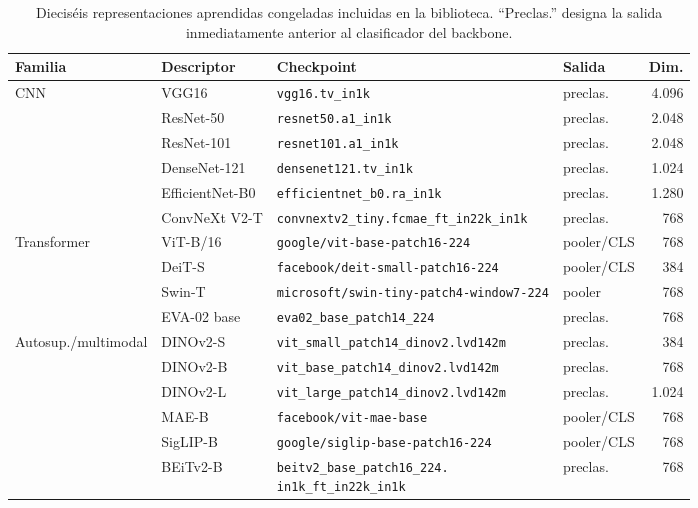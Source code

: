 \documentclass[a4paper,fleqn]{cas-sc}
\begin{document}
\begin{table}[pos=htbp]
\centering
\caption{Dieciséis representaciones aprendidas congeladas incluidas en la biblioteca. ``Preclas.'' designa la salida inmediatamente anterior al clasificador del backbone.}
\label{tab:extractores-aprendidos}
\small
\setlength{\tabcolsep}{4pt}
\begin{tabular}{@{}llp{6.3cm}p{1.7cm}r@{}}
\toprule
Familia & Descriptor & Checkpoint & Salida & Dim. \\
\midrule
CNN & VGG16 & \texttt{vgg16.tv\_in1k} & preclas. & 4.096 \\
 & ResNet-50 & \texttt{resnet50.a1\_in1k} & preclas. & 2.048 \\
 & ResNet-101 & \texttt{resnet101.a1\_in1k} & preclas. & 2.048 \\
 & DenseNet-121 & \texttt{densenet121.tv\_in1k} & preclas. & 1.024 \\
 & EfficientNet-B0 & \texttt{efficientnet\_b0.ra\_in1k} & preclas. & 1.280 \\
 & ConvNeXt V2-T & \texttt{convnextv2\_tiny.fcmae\_ft\_in22k\_in1k} & preclas. & 768 \\
\midrule
Transformer & ViT-B/16 & \texttt{google/vit-base-patch16-224} & pooler/CLS & 768 \\
 & DeiT-S & \texttt{facebook/deit-small-patch16-224} & pooler/CLS & 384 \\
 & Swin-T & \texttt{microsoft/swin-tiny-patch4-window7-224} & pooler & 768 \\
 & EVA-02 base & \texttt{eva02\_base\_patch14\_224} & preclas. & 768 \\
\midrule
Autosup./multimodal & DINOv2-S & \texttt{vit\_small\_patch14\_dinov2.lvd142m} & preclas. & 384 \\
 & DINOv2-B & \texttt{vit\_base\_patch14\_dinov2.lvd142m} & preclas. & 768 \\
 & DINOv2-L & \texttt{vit\_large\_patch14\_dinov2.lvd142m} & preclas. & 1.024 \\
 & MAE-B & \texttt{facebook/vit-mae-base} & pooler/CLS & 768 \\
 & SigLIP-B & \texttt{google/siglip-base-patch16-224} & pooler/CLS & 768 \\
 & BEiTv2-B & \makecell[l]{\texttt{beitv2\_base\_patch16\_224.}\\\texttt{in1k\_ft\_in22k\_in1k}} & preclas. & 768 \\
\bottomrule
\end{tabular}
\end{table}
\end{document}
